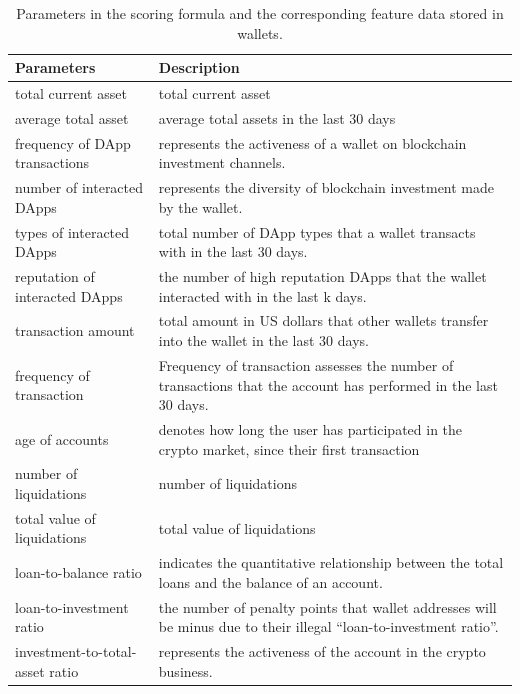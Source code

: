 \documentclass[../ICIT-Paper-2024.tex]{subfiles}
\begin{document}
\begin{table}[htbp]
    \centering
    \begin{tabular}{|l|p{8cm}|} %
        \hline
        \textbf{Parameters} & \textbf{Description} \\ %
        \hline
        total current asset & total current asset \\ \hline
        average total asset & average total assets in the last 30 days \\ \hline
        frequency of DApp transactions & represents the activeness of a wallet on blockchain investment channels. \\ \hline
        number of interacted DApps & represents the diversity of blockchain investment made by the wallet. \\ \hline
        types of interacted DApps & total number of DApp types that a wallet transacts with in the last 30 days. \\ \hline
        reputation of interacted DApps & the number of high reputation DApps that the wallet interacted with in the last k days. \\ \hline
        transaction amount & total amount in US dollars that other wallets transfer into the wallet in the last 30 days. \\ \hline
        frequency of transaction & Frequency of transaction assesses the number of transactions that the account has performed in the last 30 days. \\ \hline
        age of accounts & denotes how long the user has participated in the crypto market, since their first transaction \\ \hline
        number of liquidations & number of liquidations \\ \hline
        total value of liquidations & total value of liquidations \\ \hline
        loan-to-balance ratio & indicates the quantitative relationship between the total loans and the balance of an account.  \\ \hline
        loan-to-investment ratio & the number of penalty points that wallet addresses will be minus due to their illegal “loan-to-investment ratio”. \\ \hline
        investment-to-total-asset ratio & represents the activeness of the account in the crypto business. \\ \hline
    \end{tabular}
    \caption{Parameters in the scoring formula and the corresponding feature data stored in wallets.} %
    \label{tab:parameters} %
\end{table}
\end{document}
